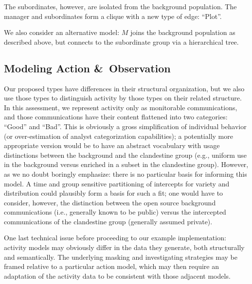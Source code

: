 \documentclass{article}
\begin{document}
The subordinates, however, are isolated from the background population.  The manager and subordinates form a clique with a new type of edge: ``Plot''.

We also consider an alternative model: $M$ joins the background population as described above, but connects to the subordinate group via a hierarchical tree.

\subsection*{Modeling Action \&\ Observation}
Our proposed types have differences in their structural organization, but we also use those types to distinguish activity by those types on their related structure.  In this assessment, we represent activity only as monitorable communications, and those communications have their content flattened into two categories: ``Good'' and ``Bad''.  This is obviously a gross simplification of individual behavior (or over-estimation of analyst categorization capabilities); a potentially more appropriate version would be to have an abstract vocabulary with usage distinctions between the background and the clandestine group (e.g., uniform use in the background versus enriched in a subset in the clandestine group).  However, as we no doubt boringly emphasize: there is no particular basis for informing this model.  A time and group sensitive partitioning of intercepts for variety and distribution could plausibly form a basis for such a fit; one would have to consider, however, the distinction between the open source background communications (i.e., generally known to be public) versus the intercepted communications of the clandestine group (generally assumed private).

One last technical issue before proceeding to our example implementation: activity models may obviously differ in the data they generate, both structurally and semantically.  The underlying masking and investigating strategies may be framed relative to a particular action model, which may then require an adaptation of the activity data to be consistent with those adjacent models.
\end{document}
